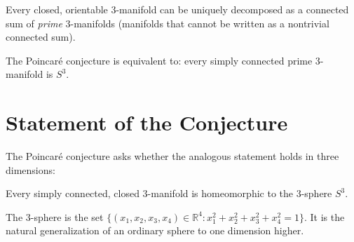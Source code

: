 \begin{theorem}
Every closed, orientable 3-manifold can be uniquely decomposed as a connected sum of \textit{prime} 3-manifolds (manifolds that cannot be written as a nontrivial connected sum).
\end{theorem}

The Poincar\'{e} conjecture is equivalent to: every simply connected prime 3-manifold is $S^3$.

\section{Statement of the Conjecture}

The Poincar\'{e} conjecture asks whether the analogous statement holds in three dimensions:

\begin{theorem}
Every simply connected, closed 3-manifold is homeomorphic to the 3-sphere $S^3$.
\end{theorem}

\begin{remark}
The 3-sphere is the set $\{(x_1, x_2, x_3, x_4) \in \mathbb{R}^4 : x_1^2 + x_2^2 + x_3^2 + x_4^2 = 1\}$. It is the natural generalization of an ordinary sphere to one dimension higher.
\end{remark}

